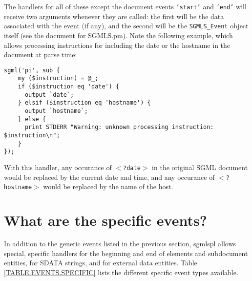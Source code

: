 The handlers for all of these except the document events
{\tt 'start'} and {\tt 'end'} will receive
two arguments whenever they are called: the first will be the data
associated with the event (if any), and the second will be the
{\tt SGMLS\_Event} object itself (see the document for
{\sc SGMLS.pm}).  Note the following example, which allows processing
instructions for including the date or the hostname in the document at
parse time:

{\footnotesize\begin{verbatim}
sgml('pi', sub {
    my ($instruction) = @_;
    if ($instruction eq 'date') {
      output `date`;
    } elsif ($instruction eq 'hostname') {
      output `hostname`;
    } else {
      print STDERR "Warning: unknown processing instruction: $instruction\n";
    }
});
\end{verbatim}}

With this handler, any occurance
of {\tt $<$?date$>$} in the original {\sc SGML} document
would be replaced by the current date and time, and any occurance of
{\tt $<$?hostname$>$} would be replaced by the name of
the host.




\section{What are the specific events?}
\label{SPECIFIC}


In addition to the generic
events listed in the previous section, {\sc sgmlspl} allows
special, specific handlers for the beginning and end of elements and
subdocument entities, for SDATA strings, and for external data
entities.  Table \ref{TABLE.EVENTS.SPECIFIC} lists the
different specific event types available.

